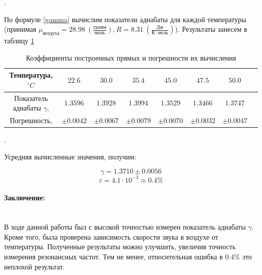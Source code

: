 \documentclass[a4paper, 12pt]{article}
\newcommand{\parag}[1]{\paragraph*{#1:}}
\newcounter{Points}
\newcommand{\point}{\arabic{Points}. \addtocounter{Points}{1}}
\begin{document}
\point По формуле \ref{gamma} вычислим показатели адиабаты для каждой температуры (принимая $\mu_{воздуха} = 28.98~(\frac{грамм}{моль}), R = 8.31~(\frac{Дж}{К \cdot моль})$). Результаты занесем в таблицу \ref{tabl:gammas}

\begin{table}[h]
    \centering
    \small
    \setlength\tabcolsep{1pt}
    \begin{tabular}{|c|c|c|c|c|c|c|c|}
    \hline 
    Температура, $^\circ C$ & $22.6$ & $30.0$ & $35.4$ & $45.0$ & $47.5$ & $50.0$ \\ \hline
    Показатель адиабаты $\gamma$, & $1.3596$ & $1.3928$ & $1.3994$ & $1.3529$ & $1.3466$ & $1.3747$ \\ \hline
    Погрешность, & $\pm 0.0042$ & $\pm 0.0067$ & $\pm 0.0079$ & $\pm 0.0070$ & $\pm 0.0032$ & $\pm 0.0047$ \\ \hline
    \end{tabular}
	\caption{Коэффициенты построенных прямых и погрешности их вычисления}
    \label{tabl:gammas}
\end{table}

\point Усредняя вычисленные значения, получим:

$$\gamma = 1.3710 \pm 0.0056$$
$$\varepsilon = 4.1 \cdot 10^{-3} \approx 0.4\%$$

\parag {Заключение} ~\\
    В ходе данной работы был с высокой точностью измерен показатель адиабаты $\gamma$. Кроме того, была проверена зависимость скорости звука в воздухе от температуры. Полученные результаты можно улучшить, увеличив точность измерения резонансных частот. Тем не менее, относительная ошибка в $0.4\%$ это неплохой результат.
\end{document}
